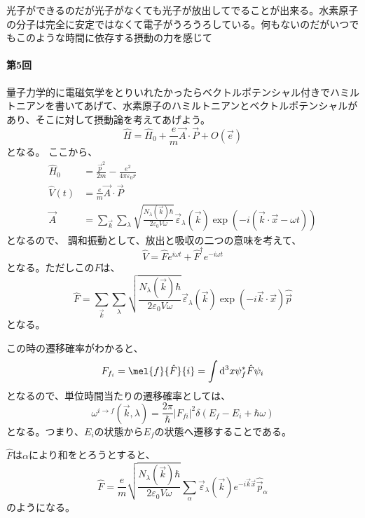 \documentclass[titlepage]{ltjsarticle}
\begin{document}
光子ができるのだが光子がなくても光子が放出してでることが出来る。水素原子の分子は完全に安定ではなくて電子がうろうろしている。何もないのだがいつでもこのような時間に依存する摂動の力を感じて



\paragraph{第5回}
量子力学的に電磁気学をとりいれたかったらベクトルポテンシャル付きでハミルトニアンを書いてあげて、水素原子のハミルトニアンとベクトルポテンシャルがあり、そこに対して摂動論を考えてあげよう。
\begin{equation}
  \hat{H} = \hat{H}_0 + \frac{e}{m} \vec{A} \cdot \vec{P} + O(\vec{e})
\end{equation}
となる。
ここから、
\begin{align}
  \hat{H}_0 & = \frac{\vec{p}^2}{2m} - \frac{e^2}{4\pi \varepsilon_0 r} \\
  \hat{V}(t) & = \frac{e}{m} \vec{A}\cdot \vec{P}\\
  \vec{A} &= \sum_{\vec{k}}\sum_{\lambda}\sqrt{\frac{N_{\lambda}(\vec{k})\hbar}{2 \varepsilon_0 V \omega}}\vec{\varepsilon}_\lambda(\vec{k})\exp\left( -i \left( \vec{k}\cdot \vec{x}- \omega t \right) \right)
\end{align}
となるので、
調和振動として、放出と吸収の二つの意味を考えて、
\begin{equation}
  \hat{V}  = \hat{F}e^{i\omega t} + \hat{F}^\dagger e^{-i\omega t}
\end{equation}
となる。ただしこの\(F\)は、
\begin{equation}
  \hat{F} = \sum_{\vec{k}}\sum_{\lambda}\sqrt{\frac{N_{\lambda}(\vec{k})\hbar}{2 \varepsilon_0 V \omega}}\vec{\varepsilon}_\lambda(\vec{k})\exp\left( - i \vec{k}\cdot \vec{x} \right) \hat{\vec{p}}
\end{equation}
となる。

この時の遷移確率がわかると、
\begin{equation}
  F_{f_i} = \mel{f}{\hat{F}}{i} = \int \odif[order=3]{x } \psi^*_{f} \hat{F} \psi_i
\end{equation}
となるので、単位時間当たりの遷移確率としては、
\begin{equation}
  \omega^{i\to f}(\vec{k},\lambda) = \frac{2\pi}{\hbar} |F_{fi}|^2 \delta(E_f - E_i + \hbar \omega)
\end{equation}
となる。つまり、\(E_i\)の状態から\(E_f\)の状態へ遷移することである。

\(\hat{F}\)は\(\alpha\)により和をとろうとすると、
\begin{equation}
  \hat{F} = \frac{e }{m} \sqrt{\frac{N_\lambda(\vec{k})\hbar}{2\varepsilon_0 V \omega}}\sum_\alpha \vec{\varepsilon}_\lambda(\vec{k})e^{-i \vec{k}\vec{x}}\hat{\vec{p}}_\alpha
\end{equation}
のようになる。
\end{document}
